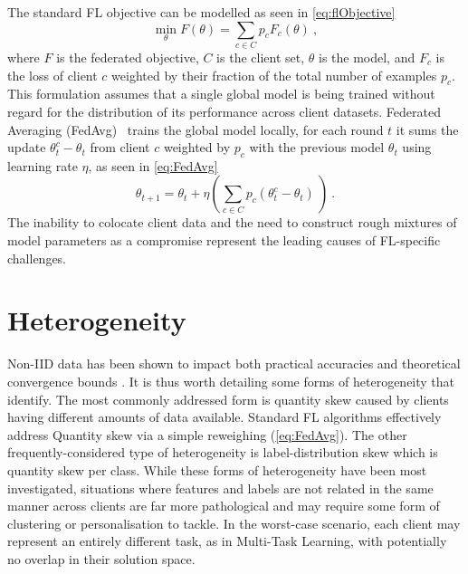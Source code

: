
The standard FL objective can be modelled as seen in \cref{eq:flObjective}
\begin{equation} \label{eq:flObjective}
    \underset{\theta}{\min} F(\theta) = \sum_{c \in C} p_c F_c(\theta) \ ,
\end{equation}
where \(F\) is the federated objective, $C$ is the client set, $\theta$ is the model, and \(F_c\) is the loss of client \(c\) weighted by their fraction of the total number of examples $p_c$. This formulation assumes that a single global model is being trained without regard for the distribution of its performance across client datasets. Federated Averaging (FedAvg)~\citep{FedAvg} trains the global model locally, for each round $t$ it sums the update \(\theta_t^c - \theta_t\) from client $c$ weighted by \(p_c\) with the previous model \(\theta_t\) using learning rate \( \eta \), as seen in \cref{eq:FedAvg}
\begin{equation} \label{eq:FedAvg}
    \theta_{t+1} = \theta_t + \eta \left( \sum_{c \in C} p_c \left(\theta_t^c - \theta_t \right) \ \right) \ .
\end{equation}
The inability to colocate client data and the need to construct rough mixtures of model parameters as a compromise represent the leading causes of FL-specific challenges.

\section{Heterogeneity}\label{background:data_heterogeneity}

Non-IID data has been shown to impact both practical accuracies \citep{FLwithNonIID, NonIIDQagmire} and theoretical convergence bounds \citep{OnTheConvergenceOfFedAvgOnNonIIDdata}. It is thus worth detailing some forms of heterogeneity that \citet{AdvancedAndOpenProblems} identify. The most commonly addressed form is quantity skew caused by clients having different amounts of data available. Standard FL algorithms effectively address Quantity skew via a simple reweighing (\cref{eq:FedAvg}). The other frequently-considered type of heterogeneity is label-distribution skew which is quantity skew per class. While these forms of heterogeneity have been most investigated, situations where features and labels are not related in the same manner across clients are far more pathological and may require some form of clustering or personalisation to tackle. In the worst-case scenario, each client may represent an entirely different task, as in Multi-Task Learning, with potentially no overlap in their solution space.


